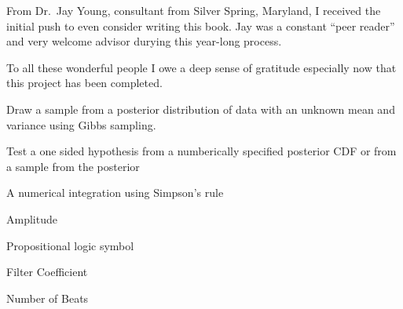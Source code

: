 \documentclass{wileySix}
\begin{document}
\begin{acknowledgments}
From Dr.~Jay Young, consultant from Silver Spring, Maryland, I received
the initial push to even consider writing this book. Jay was a constant
``peer reader'' and very welcome advisor durying this year-long process.


To all these wonderful people I owe a deep sense of gratitude especially now
that this project has been completed.
\end{acknowledgments}

\begin{acronyms}
\end{acronyms}

\begin{glossary}
Draw a sample from a posterior distribution
of data with an unknown mean and variance using Gibbs sampling.

Test a one sided hypothesis from a numberically
specified posterior CDF or from a sample from the posterior

A numerical integration using Simpson's rule
\end{glossary}

\begin{symbols}
Amplitude

\term{\hbox{\&}}Propositional logic symbol 

Filter Coefficient

\bigskip

Number of Beats
\end{symbols}
\end{document}
